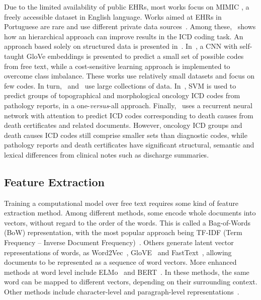 \documentclass[runningheads]{llncs}
\begin{document}
Due to the limited availability of public EHRs, most works focus on MIMIC \cite{johnsonMIMICIIIFreelyAccessible2016}, a freely accessible dataset in English language. Works aimed at EHRs in Portuguese are rare and use different private data sources~\cite{delimaHierarchicalApproachAutomatic1998,ferraoUsingStructuredEHR2013a,oleynikAutomated2017,santosUsingDeepConvolutional2018,duarteDeepNeuralModels2018}. Among these,~\cite{delimaHierarchicalApproachAutomatic1998} shows how an hierarchical approach can improve results in the ICD coding task. An approach based solely on structured data is presented in~\cite{ferraoUsingStructuredEHR2013a}. In~\cite{santosUsingDeepConvolutional2018}, a CNN with self-taught GloVe embeddings is presented to predict a small set of possible codes from free text, while a cost-sensitive learning approach is implemented to overcome class imbalance. These works use relatively small datasets and focus on few codes. In turn,~\cite{oleynikAutomated2017} and~\cite{duarteDeepNeuralModels2018} use large collections of data. In~\cite{oleynikAutomated2017}, SVM is used to predict groups of topographical and morphological oncology ICD codes from pathology reports, in a one-\textit{versus}-all approach. Finally,~\cite{duarteDeepNeuralModels2018} uses a recurrent neural network with attention to predict ICD codes corresponding to death causes from death certificates and related documents. However, oncology ICD groups and death causes ICD codes still comprise smaller sets than diagnostic codes, while pathology reports and death certificates have significant structural, semantic and lexical differences from clinical notes such as discharge summaries.

\subsection{Feature Extraction}

Training a computational model over free text requires some kind of feature extraction method. Among different methods, some encode whole documents into vectors, without regard to the order of the words. This is called a Bag-of-Words (BoW) representation, with the most popular approach being TF-IDF (Term Frequency -- Inverse Document Frequency)~\cite{saltonTermweightingApproachesAutomatic1988}. Others generate latent vector representations of words, as Word2Vec~\cite{mikolovEfficientEstimationWord2013}, GloVE~\cite{penningtonGloveGlobalVectors2014} and FastText~\cite{bojanowskiEnrichingWordVectors2017}, allowing documents to be represented as a sequence of word vectors. More enhanced methods at word level include ELMo~\cite{petersDeepContextualizedWord2018} and BERT~\cite{devlinBERTPretrainingDeep2019}. In these methods, the same word can be mapped to different vectors, depending on their surrounding context. Other methods include character-level and paragraph-level representations~\cite{zhangCharacterlevelConvolutionalNetworks2016,leDistributedRepresentationsSentences2014}. 
\end{document}
